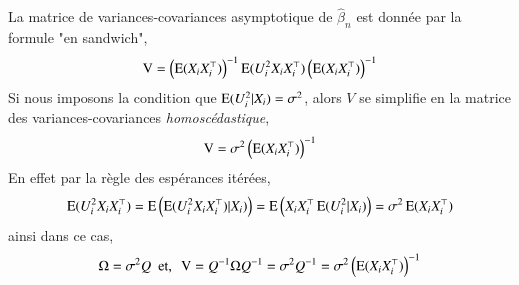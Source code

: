 \documentclass[10pt, reqno]{amsart}
\begin{document}
\begin{remarque}\label{re2}
La matrice de variances-covariances asymptotique de $\hat{\beta}_n$ est donnée par la formule "en sandwich",
\begin{align*}
\operatorname{V} = \left(\operatorname{E}(X_iX_i^\top)\right)^{-1} \operatorname{E}(U_i^2X_iX_i^\top) \left(\operatorname{E}(X_iX_i^\top)\right)^{-1}
\end{align*}
Si nous imposons la condition que $\operatorname{E}(U_i^2|X_i) = \sigma^2$, alors $V$ se simplifie en la matrice des variances-covariances \emph{homoscédastique},
\begin{align}
\operatorname{V} = \sigma^2\left(\operatorname{E}(X_iX_i^\top)\right)^{-1}
\label{eq4}
\end{align}
En effet par la règle des espérances itérées,
\begin{align*}
\operatorname{E}(U_i^2X_iX_i^\top) = \operatorname{E}\left(\operatorname{E}(U_i^2X_iX_i^\top) | X_i) \right) = \operatorname{E}\left(X_iX_i^\top\operatorname{E}(U_i^2|X_i)\right) = \sigma^2\operatorname{E}(X_iX_i^\top)
\end{align*}
ainsi dans ce cas, 
\begin{align*}
\Omega = \sigma^2 Q \ \ \textrm{et,} \ \ \operatorname{V} = Q^{-1}\Omega  Q^{-1} = \sigma^2  Q^{-1} =\sigma^2\left(\operatorname{E}(X_iX_i^\top)\right)^{-1}
\end{align*}
\end{remarque}
\end{document}
